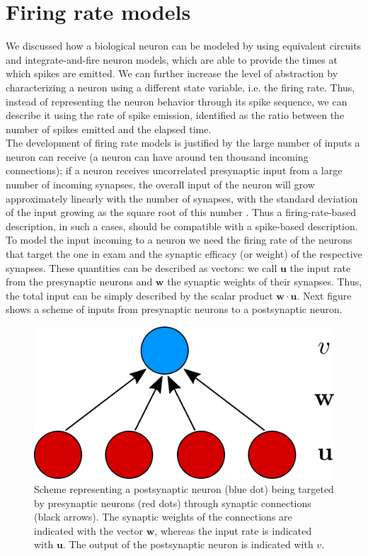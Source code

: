 \documentclass[a4paper, 12pt, twoside, openright]{book}
\begin{document}
\section{Firing rate models}
\label{sec:firing_rate_models}
We discussed how a biological neuron can be modeled by using equivalent circuits and integrate-and-fire neuron models, which are able to provide the times at which spikes are emitted. We can further increase the level of abstraction by characterizing a neuron using a different state variable, i.e. the firing rate. Thus, instead of representing the neuron behavior through its spike sequence, we can describe it using the rate of spike emission, identified as the ratio between the number of spikes emitted and the elapsed time.\\
The development of firing rate models is justified by the large number of inputs a neuron can receive (a neuron can have around ten thousand incoming connections); if a neuron receives uncorrelated presynaptic input from a large number of incoming synapses, the overall input of the neuron will grow approximately linearly with the number of synapses, with the standard deviation of the input growing as the square root of this number \cite{abbot2005}. Thus a firing-rate-based description, in such a cases, should be compatible with a spike-based description.\\
To model the input incoming to a neuron we need the firing rate of the neurons that target the one in exam and the synaptic efficacy (or weight) of the respective synapses. These quantities can be described as vectors: we call $\mathbf{u}$ the input rate from the presynaptic neurons and $\mathbf{w}$ the synaptic weights of their synapses. Thus, the total input can be simply described by the scalar product $\mathbf{w}\cdot\mathbf{u}$. Next figure shows a scheme of inputs from presynaptic neurons to a postsynaptic neuron.

\begin{figure}[H]
    \centering
    \includegraphics[width=0.5\columnwidth]{figures/single_neuron_input.png}
    \caption{Scheme representing a postsynaptic neuron (blue dot) being targeted by presynaptic neurons (red dots) through synaptic connections (black arrows). The synaptic weights of the connections are indicated with the vector $\mathbf{w}$, whereas the input rate is indicated with $\mathbf{u}$. The output of the postsynaptic neuron is indicated with $v$.}
    \label{fig:single_neuron_input}
\end{figure}
\end{document}
